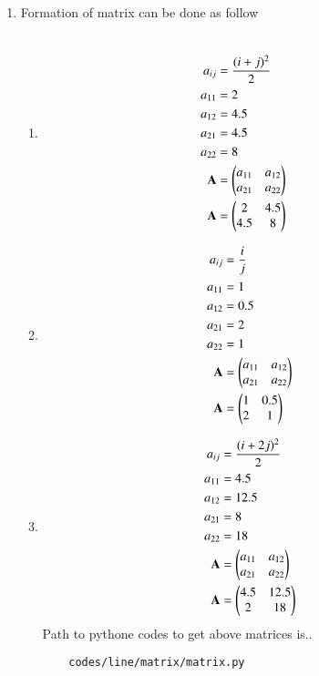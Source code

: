\renewcommand{\theequation}{\theenumi}
\begin{enumerate}[label=\arabic*.,ref=\thesubsection.\theenumi]

\item Formation of matrix can be done as follow
\begin{enumerate}
	\item 
	\begin{align}
	\\
	a_{ij} &= \frac{(i+j)^2}{2}
	\\
	a_{11} &= 2		
	\\
	a_{12} &= 4.5
	\\
	a_{21} &=4.5	
	\\	a_{22} &= 8
	\\
	\mathbf {A} &= \begin{pmatrix}a_{11} & a_{12}\\a_{21} & a_{22}\end{pmatrix}
	\\
	\mathbf {A} &= \begin{pmatrix}2 & 4.5\\4.5 & 8\end{pmatrix}
	\end{align}
	\item 
	\begin{align}
	a_{ij} &= \frac{i}{j}
	\\
	a_{11} &= 1		
	\\	a_{12} &= 0.5
	\\
	a_{21} &=2		
	\\a_{22} &= 1
	\\
	\mathbf {A} &= \begin{pmatrix}a_{11} & a_{12}\\a_{21} & a_{22}\end{pmatrix}
	\\
	\mathbf{ A} &= \begin{pmatrix}1 & 0.5\\2 & 1\end{pmatrix}
	\end{align}
	\item 
	\begin{align}
	a_{ij} &= \frac{(i+2j)^2}{2}
	\\
	a_{11} &= 4.5	
	\\	a_{12} &= 12.5
	\\
	a_{21} &=8	
	\\	a_{22} &= 18
	\\
  \mathbf {A} &= \begin{pmatrix}a_{11} & a_{12}\\a_{21} & a_{22}\end{pmatrix}
	\\
	\mathbf {A} &= \begin{pmatrix}4.5 & 12.5\\2 & 18\end{pmatrix}
	\end{align}
	Path to pythone codes to get above matrices is..
	\begin{lstlisting}
	codes/line/matrix/matrix.py
	\end{lstlisting} 
\end{enumerate}
\end{enumerate}